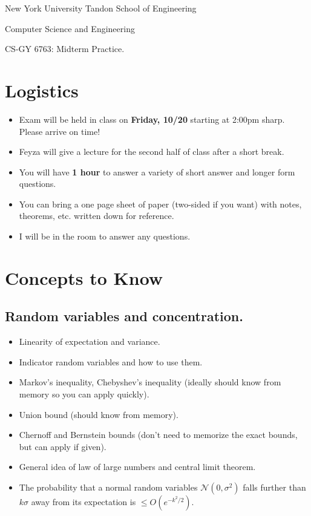 \documentclass[10pt]{article}
\begin{document}
	
\begin{center}
	\normalsize
	New York University Tandon School of Engineering
	
	Computer Science and Engineering
	\medskip
	
	\large
	CS-GY 6763: Midterm Practice. 
	\medskip
\end{center} 

\section{Logistics}
\begin{itemize}
	\item Exam will be held in class on \textbf{Friday, 10/20} starting at 2:00pm sharp. Please arrive on time!
	\item Feyza will give a lecture for the second half of class after a short break. 
	\item You will have \textbf{1 hour} to answer a variety of short answer and longer form questions.
	\item You can bring a one page sheet of paper (two-sided if you want) with notes, theorems, etc. written down for reference. 
	\item I will be in the room to answer any questions.
\end{itemize}

\section{Concepts to Know}

\subsection{Random variables and concentration.}
\begin{itemize}
	\item Linearity of expectation and variance.
	\item Indicator random variables and how to use them.
	\item Markov's inequality, Chebyshev's inequality (ideally should know from memory so you can apply quickly).
	\item Union bound  (should know from memory).
	\item Chernoff and Bernstein bounds (don't need to memorize the exact bounds, but can apply if given).
	\item General idea of law of large numbers and central limit theorem. 
	\item The probability that a normal random variables $\mathcal{N}(0,\sigma^2)$ falls further than $k\sigma$ away from its expectation is $\leq O(e^{-k^2/2})$. 
\end{itemize}
\end{document}
